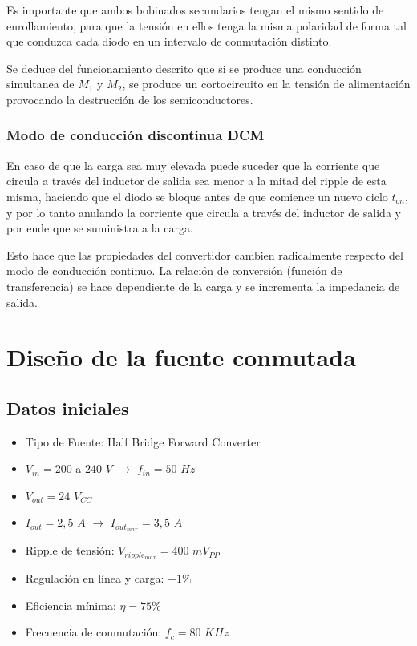 \documentclass[11pt, a4paper]{article}
\begin{document}
Es importante que ambos bobinados secundarios tengan el mismo sentido de enrollamiento, para que la tensión en ellos tenga la misma polaridad de forma tal que conduzca cada diodo en un intervalo de conmutación distinto.

Se deduce del funcionamiento descrito que si se produce una conducción simultanea de $M_1$ y $M_2$, se produce un cortocircuito en la tensión de alimentación provocando la destrucción de los semiconductores.

\subsubsection{Modo de conducción discontinua DCM}
En caso de que la carga sea muy elevada puede suceder que la corriente que circula a través del inductor de salida sea menor a la mitad del ripple de esta misma, haciendo que el diodo se bloque antes de que comience un nuevo ciclo $t_{on}$, y por lo tanto anulando la corriente que circula a través del inductor de salida y por ende que se suministra a la carga.

Esto hace que las propiedades del convertidor cambien radicalmente respecto del modo de conducción continuo. La relación de conversión (función de transferencia) se hace dependiente de la carga y se incrementa la impedancia de salida.

\section{Diseño de la fuente conmutada}
\subsection{Datos iniciales}
\begin{itemize}
	\item Tipo de Fuente: Half Bridge Forward Converter
	\item $V_{in} = 200$ a $240$ $V$ $\rightarrow$ $f_{in} = 50$ $Hz$
	\item $V_{out} = 24$ $V_{CC}$
	\item $I_{out} = 2,5$ $A$ $\rightarrow$ $I_{out_{max}} = 3,5$ $A$
	\item Ripple de tensión: $V_{ripple_{max}} = 400$ $mV_{PP}$
	\item Regulación en línea y carga: $\pm 1 \%$
	\item Eficiencia mínima: $\eta = 75 \%$
	\item Frecuencia de conmutación: $f_c = 80$ $KHz$
\end{itemize}
\end{document}
